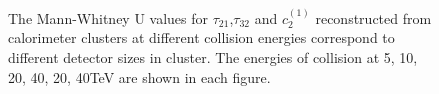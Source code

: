 \documentclass[final,1p,11pt]{elsarticle}
\begin{document}
\begin{figure}
\begin{center}
\end{center}
\caption{The Mann-Whitney U values for $\tau_{21}$,$\tau_{32}$ and $c_2^{(1)}$ reconstructed from calorimeter clusters at different collision energies correspond to different detector sizes in cluster. The energies of collision at 5, 10, 20, 40, 20, 40TeV are shown in each figure.}
\label{fig:cluster_U_summary}
\end{figure}
\end{document}
